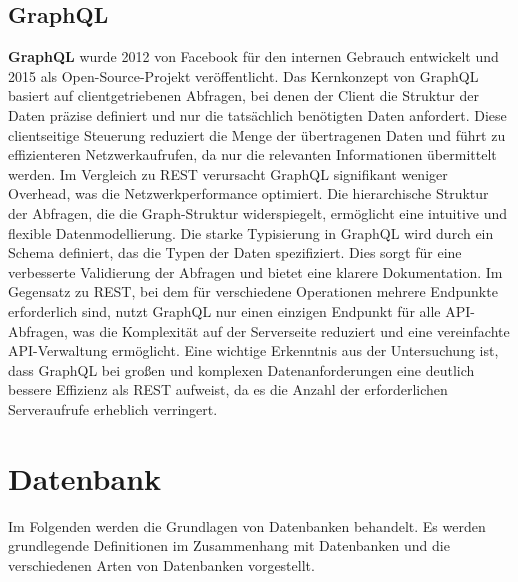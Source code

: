 \subsection{GraphQL} %
\label{sec:graphql}
\textbf{GraphQL} wurde 2012 von Facebook für den internen Gebrauch entwickelt und 2015 als Open-Source-Projekt veröffentlicht. Das Kernkonzept von GraphQL basiert auf clientgetriebenen Abfragen, bei denen der Client die Struktur der Daten präzise definiert und nur die tatsächlich benötigten Daten anfordert. Diese clientseitige Steuerung reduziert die Menge der übertragenen Daten und führt zu effizienteren Netzwerkaufrufen, da nur die relevanten Informationen übermittelt werden. 
Im Vergleich zu REST verursacht GraphQL signifikant weniger Overhead, was die Netzwerkperformance optimiert. Die hierarchische Struktur der Abfragen, die die Graph-Struktur widerspiegelt, ermöglicht eine intuitive und flexible Datenmodellierung. Die starke Typisierung in GraphQL wird durch ein Schema definiert, das die Typen der Daten spezifiziert. Dies sorgt für eine verbesserte Validierung der Abfragen und bietet eine klarere Dokumentation. Im Gegensatz zu REST, bei dem für verschiedene Operationen mehrere Endpunkte erforderlich sind, nutzt GraphQL nur einen einzigen Endpunkt für alle API-Abfragen, was die Komplexität auf der Serverseite reduziert und eine vereinfachte API-Verwaltung ermöglicht. Eine wichtige Erkenntnis aus der Untersuchung ist, dass GraphQL bei großen und komplexen Datenanforderungen eine deutlich bessere Effizienz als REST aufweist, da es die Anzahl der erforderlichen Serveraufrufe erheblich verringert. \citep{graphqlreplacerest}

\section{Datenbank} %
\label{sec:datenbankGrundlagen}
Im Folgenden werden die Grundlagen von Datenbanken behandelt. Es werden grundlegende Definitionen im Zusammenhang mit Datenbanken und die verschiedenen Arten von Datenbanken vorgestellt.
\newpage
